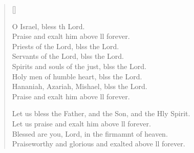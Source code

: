 \begin{verse}[\versewidth]
\begin{patverse}
O Israel, bless th Lord.\Med\\
Praise and exalt him above ll forever.\\
Priests of the Lord, blss the Lord.\Med\\
Servants of the Lord, blss the Lord.\\
Spirits and souls of the just, blss the Lord.\Med\\
Holy men of humble heart, blss the Lord.\\
Hananiah, Azariah, Mishael, blss the Lord.\Med\\
Praise and exalt him above ll forever.

Let us bless the Father, and the Son, and the Hly Spirit.\Med\\
Let us praise and exalt him above ll forever.\\
Blessed are you, Lord, in the firmamnt of heaven.\Med\\
Praiseworthy and glorious and exalted above ll forever.
  \end{patverse}
\end{verse}
